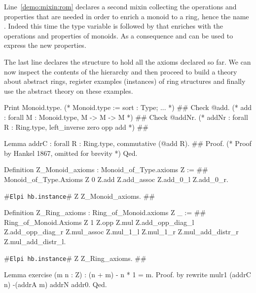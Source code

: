\documentclass[a4paper,UKenglish,cleveref, autoref]{lipics-v2019}
\newcommand{\mixin}{mixin}
\newcommand{\hbinstance}{{\tt\color{dkgreen}Elpi hb.instance}}
\theoremstyle{implem}
\theoremstyle{implem}
\theoremstyle{command}
\begin{document}
Line~\ref{demo:mixin:rom} declares a second \mixin{} collecting the operations
and properties that are needed in order to enrich a monoid to a ring, hence
the name . Indeed this time the type variable 
is followed by  that enriches
 with the operations and properties of monoids. As a consequence
 and  can be used to express the new properties.

The last line declares the structure  to hold all the axioms declared
so far. We can now inspect the contents of the hierarchy and then
proceed to build a theory about abstract rings,
register examples (instances) of ring structures
and finally use the abstract theory on these examples.

\begin{coqcode}
Print Monoid.type. (* Monoid.type  :=  { sort : Type;  ... }                           *) #\label{demo:theory:print:type}#
Check @add.        (* add          :   forall M : Monoid.type, M -> M -> M             *) #\label{demo:theory:check:add}#
Check @addNr.      (* addNr        :   forall R : Ring.type, left_inverse zero opp add *) #\label{demo:theory:check:addNr}#

Lemma addrC : forall R : Ring.type, commutative (@add R).                       #\label{demo:theory:state:addrC}#
Proof. (* Proof by Hankel 1867, omitted for brevity *) Qed.

Definition Z_Monoid_axioms : Monoid_of_Type.axioms Z :=                         #\label{demo:theory:z:monoid:axioms}#
  Monoid_of_Type.Axioms Z 0 Z.add
    Z.add_assoc Z.add_0_l Z.add_0_r.

#\hbinstance{}# Z Z_Monoid_axioms.                                            #\label{demo:theory:z:monoid:canonical}#

Definition Z_Ring_axioms : Ring_of_Monoid.axioms Z _ :=                        #\label{demo:theory:z:ring:axioms}#
  Ring_of_Monoid.Axioms Z 1 Z.opp Z.mul
    Z.add_opp_diag_l Z.add_opp_diag_r Z.mul_assoc Z.mul_1_l Z.mul_1_r
    Z.mul_add_distr_r Z.mul_add_distr_l.

#\hbinstance{}# Z Z_Ring_axioms.                                              #\label{demo:theory:z:ring:canonical}#

Lemma exercise (m n : Z) : (n + m) - n * 1 = m.
Proof. by rewrite mulr1 (addrC n) -(addrA m) addrN addr0. Qed.
\end{coqcode}
\end{document}
